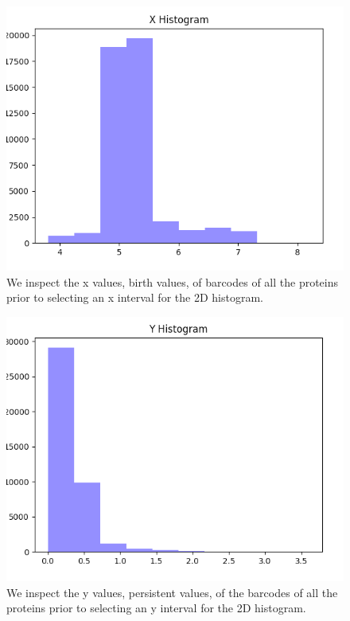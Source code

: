 \documentclass[12pt, a4paper, twocolumn, fullpage]{article}
\theoremstyle{plain}
\theoremstyle{definition}
\theoremstyle{remark}
\begin{document}
\begin{figure}
    \includegraphics[width=\linewidth]{xhist.png}
    \caption{We inspect the x values, birth values, of barcodes of all the proteins prior to selecting an x interval for the 2D histogram.}
    \label{xhist}
\end{figure}
\begin{figure}
    \includegraphics[width=\linewidth]{yhist.png}
    \caption{We inspect the y values, persistent values, of the barcodes of all the proteins prior to selecting an y interval for the 2D histogram.}
    \label{yhist}
\end{figure}
\end{document}
